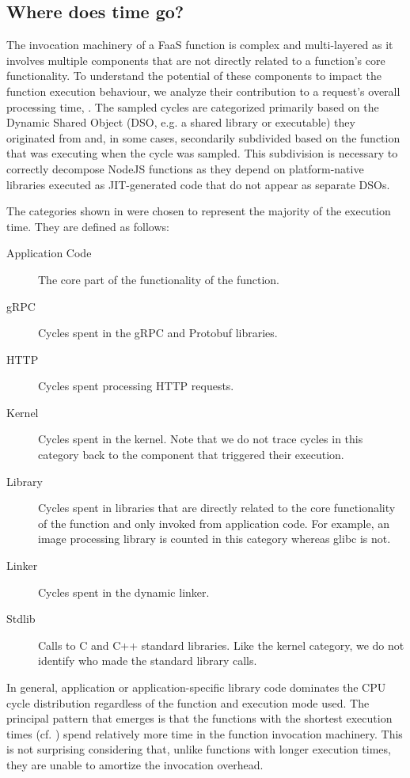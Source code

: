 \subsection{Where does time go?}
\label{subsec:time}

The invocation machinery of a FaaS function is complex and multi-layered as it involves multiple components that are not directly related to a function's core functionality. To understand the potential of these components to impact the function execution behaviour, we analyze their contribution to a request's overall processing time, . The sampled cycles are categorized primarily based on the Dynamic Shared Object (DSO, e.g. a shared library or executable) they originated from and, in some cases, secondarily subdivided based on the function that was executing when the cycle was sampled. This subdivision is necessary to correctly decompose NodeJS functions as they depend on platform-native libraries executed as JIT-generated code that do not appear as separate DSOs.

The categories shown in   were chosen to represent the majority of the execution time. They are defined as follows:
\noindent
\begin{description}
\item[Application Code]  The core part of the functionality of the function.
\item [gRPC] Cycles spent in the gRPC and Protobuf libraries.
\item [HTTP] Cycles spent processing HTTP requests.
\item [Kernel] Cycles spent in the kernel. Note that we do not trace cycles in this category back to the component that triggered their execution.
\item[Library] Cycles spent in libraries that are directly related to the core functionality of the function and only invoked from application code. For example, an image processing library is counted in this category whereas glibc is not.
\item[Linker] Cycles spent in the dynamic linker.
\item[Stdlib] Calls to C and C++ standard libraries. Like the kernel category, we do not identify who made the standard library calls.
  \end{description}

In general, application or application-specific library code dominates the CPU cycle distribution regardless of the function and execution mode used. The principal pattern that emerges is that the functions with the shortest execution times (cf. ) spend relatively more time in the function invocation machinery. This is not surprising considering that, unlike functions with longer execution times, they are unable to amortize the invocation overhead.

